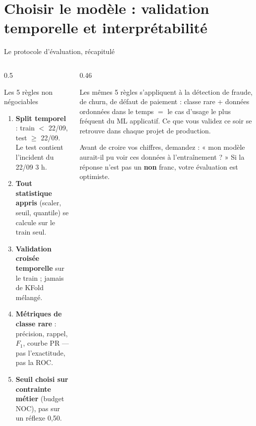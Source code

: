 \section{Choisir le modèle : validation temporelle et interprétabilité}

\begin{frame}{Le protocole d'évaluation, récapitulé}
\begin{columns}[t]
\begin{column}{0.5\textwidth}
\begin{block}{Les 5 règles non négociables}
\begin{enumerate}
\item \textbf{Split temporel} : train $<$ 22/09, test $\ge$ 22/09.
Le test contient l'incident du 22/09 3 h.
\item \textbf{Tout statistique appris} (scaler, seuil, quantile)
se calcule sur le train seul.
\item \textbf{Validation croisée temporelle} sur le train ;
jamais de KFold mélangé.
\item \textbf{Métriques de classe rare} : précision, rappel,
$F_1$, courbe PR --- pas l'exactitude, pas la ROC.
\item \textbf{Seuil choisi sur contrainte métier} (budget NOC),
pas sur un réflexe 0,50.
\end{enumerate}
\end{block}
\end{column}
\begin{column}{0.46\textwidth}
\begin{kbox}
Les mêmes 5 règles s'appliquent à la détection de fraude,
de churn, de défaut de paiement : classe rare + données
ordonnées dans le temps $=$ le cas d'usage le plus fréquent
du ML applicatif. Ce que vous validez ce soir se retrouve
dans chaque projet de production.
\end{kbox}
\begin{wbox}
Avant de croire vos chiffres, demandez : « mon modèle aurait-il
pu voir ces données à l'entraînement ? » Si la réponse n'est pas
un \textbf{non} franc, votre évaluation est optimiste.
\end{wbox}
\end{column}
\end{columns}
\end{frame}


